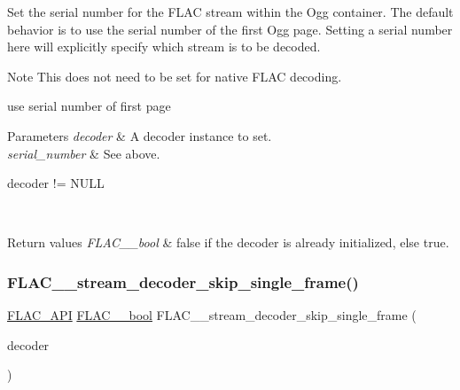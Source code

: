 Set the serial number for the F\+L\+AC stream within the Ogg container. The default behavior is to use the serial number of the first Ogg page. Setting a serial number here will explicitly specify which stream is to be decoded.

\begin{DoxyNote}{Note}
This does not need to be set for native F\+L\+AC decoding.
\end{DoxyNote}
{\ttfamily use} serial number of first page 
\begin{DoxyParams}{Parameters}
{\em decoder} & A decoder instance to set. \\
\hline
{\em serial\+\_\+number} & See above.  
\begin{DoxyCode}
decoder != NULL 
\end{DoxyCode}
 \\
\hline
\end{DoxyParams}

\begin{DoxyRetVals}{Return values}
{\em F\+L\+A\+C\+\_\+\+\_\+bool} & {\ttfamily false} if the decoder is already initialized, else {\ttfamily true}. \\
\hline
\end{DoxyRetVals}
\mbox{\label{group__flac__stream__decoder_ga371bc2b4f5571e40c47f4db5a8a745f8}} 
\subsubsection{\texorpdfstring{F\+L\+A\+C\+\_\+\+\_\+stream\+\_\+decoder\+\_\+skip\+\_\+single\+\_\+frame()}{FLAC\_\_stream\_decoder\_skip\_single\_frame()}}
{\footnotesize\ttfamily \hyperlink{group__flac__export_ga56ca07df8a23310707732b1c0007d6f5}{F\+L\+A\+C\+\_\+\+A\+PI} \hyperlink{ordinals_8h_a95103469f1cbd78b8cf250194985b34e}{F\+L\+A\+C\+\_\+\+\_\+bool} F\+L\+A\+C\+\_\+\+\_\+stream\+\_\+decoder\+\_\+skip\+\_\+single\+\_\+frame (\begin{DoxyParamCaption}\item[{\hyperlink{struct_f_l_a_c_____stream_decoder}{F\+L\+A\+C\+\_\+\+\_\+\+Stream\+Decoder} $\ast$}]{decoder }\end{DoxyParamCaption})}

